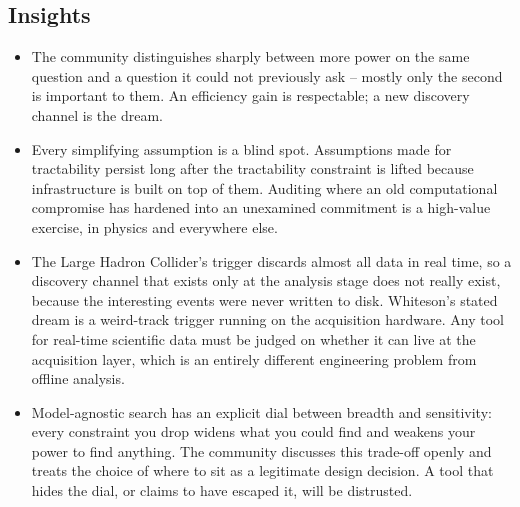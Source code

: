 \documentclass[11pt]{article}
\begin{document}
\subsection*{Insights}
\begin{itemize}
    \item The community distinguishes sharply between more power on the same question and a question it could not previously ask -- mostly only the second is important to them. An efficiency gain is respectable; a new discovery channel is the dream.
    \item Every simplifying assumption is a blind spot. Assumptions made for tractability persist long after the tractability constraint is lifted because infrastructure is built on top of them. Auditing where an old computational compromise has hardened into an unexamined commitment is a high-value exercise, in physics and everywhere else.
    \item The Large Hadron Collider's trigger discards almost all data in real time, so a discovery channel that exists only at the analysis stage does not really exist, because the interesting events were never written to disk. Whiteson's stated dream is a weird-track trigger running on the acquisition hardware. Any tool for real-time scientific data must be judged on whether it can live at the acquisition layer, which is an entirely different engineering problem from offline analysis.
    \item Model-agnostic search has an explicit dial between breadth and sensitivity: every constraint you drop widens what you could find and weakens your power to find anything. The community discusses this trade-off openly and treats the choice of where to sit as a legitimate design decision. A tool that hides the dial, or claims to have escaped it, will be distrusted.
\end{itemize}
\end{document}
